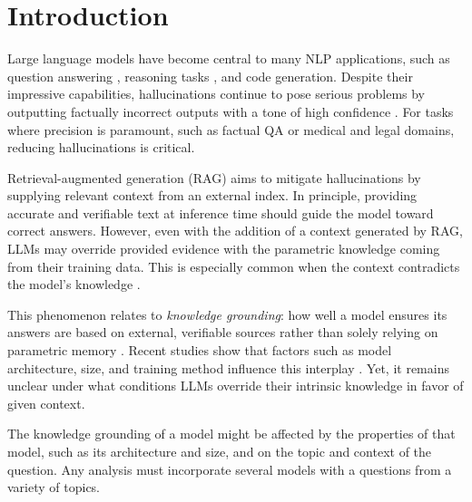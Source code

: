 \section{Introduction}

Large language models have become central to many NLP applications, such as question answering \cite{gpt3,how_can_we_know}, reasoning tasks \cite{treeofthoughts}, and code generation\cite{alphacode_generation}.
Despite their impressive capabilities, hallucinations continue to pose serious problems by outputting factually incorrect outputs with a tone of high confidence \cite{how_can_we_know}.
For tasks where precision is paramount, such as factual QA or medical and legal domains, reducing hallucinations is critical\cite{mitigating_hallucinations}.

Retrieval-augmented generation (RAG) \cite{rag} aims to mitigate hallucinations by supplying relevant context from an external index.
In principle, providing accurate and verifiable text at inference time should guide the model toward correct answers.
However, even with the addition of a context generated by RAG, LLMs may override provided evidence with the parametric knowledge coming from their training data.
This is especially common when the context contradicts the model's knowledge \cite{factual_recall,ragged}.

This phenomenon relates to \emph{knowledge grounding}: how well a model ensures its answers are based on external, verifiable sources rather than solely relying on parametric memory \cite{rag}.
Recent studies show that factors such as model architecture, size, and training method influence this interplay \cite{factual_recall,flant5,llama}.
Yet, it remains unclear under what conditions LLMs override their intrinsic knowledge in favor of given context.

The knowledge grounding of a model might be affected by the properties of that model, such as its architecture and size, and on the topic and context of the question.
Any analysis must incorporate several models with a questions from a variety of topics.

